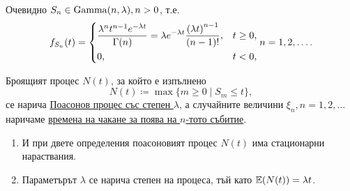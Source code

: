 \documentclass[numbers=endperiod, DIV=15, bibliography=totocnumbered]{scrartcl}
\begin{document}
\begin{definition}
\begin{enumerate}
    Очевидно $S_n \in \operatorname{Gamma}(n, \lambda), n > 0$, т.е.
    \begin{displaymath}
      f_{S_n}(t)
      =
      \begin{dcases}
        \frac {\lambda^n t^{n-1} e^{-\lambda t}} {\Gamma(n)} = \lambda e^{-\lambda t} \frac {{(\lambda t)}^{n-1}} {(n-1)!}, &t \geq 0, \\
        0, &t < 0,
      \end{dcases}
      n = 1, 2, \ldots.
    \end{displaymath}

    Броящият процес $N(t)$, за който е изпълнено
    \begin{displaymath}
      N(t) \coloneqq \max \{ m \geq 0 \mid S_m \leq t \},
    \end{displaymath}
    се нарича \uline{Поасонов процес със степен $\lambda$}, а случайните величини $\xi_n, n = 1, 2, \ldots$ наричаме \uline{времена на чакане за поява на $n$-тото събитие}.
  \end{enumerate}
\end{definition}

\begin{note}
  \mbox{}
  \begin{enumerate}
    \item И при двете определения поасоновият процес $N(t)$ има стационарни нараствания.
    \item Параметърът $\lambda$ се нарича степен на процеса, тъй като $\mathbb{E}(N(t)) = \lambda t$.
  \end{enumerate}
\end{note}
\end{document}
